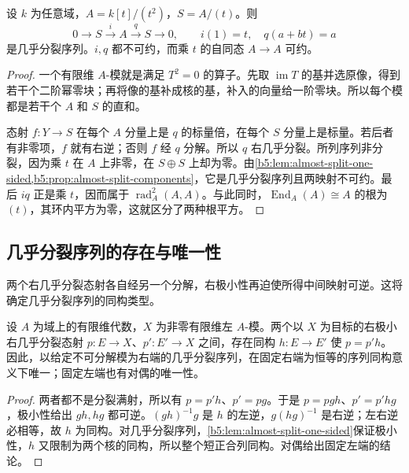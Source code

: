 \begin{example}\label{b5:exm:dual-number-almost-split}
	设 \(k\) 为任意域，\(A=k[t]/(t^2)\)，\(S=A/(t)\)。则
	\[
		0\longrightarrow S\xrightarrow{i}A\xrightarrow{q}S\longrightarrow0,
		\qquad i(1)=t,\quad q(a+bt)=a
	\]
	是几乎分裂序列。\(i,q\) 都不可约，而乘 \(t\) 的自同态 \(A\to A\) 可约。
\end{example}
\begin{proof}
	一个有限维 \(A\)-模就是满足 \(T^2=0\) 的算子。先取 \(\operatorname{im}T\) 的基并选原像，得到若干个二阶幂零块；再将像的基补成核的基，补入的向量给一阶零块。所以每个模都是若干个 \(A\) 和 \(S\) 的直和。

	态射 \(f:Y\to S\) 在每个 \(A\) 分量上是 \(q\) 的标量倍，在每个 \(S\) 分量上是标量。若后者有非零项，\(f\) 就有右逆；否则 \(f\) 经 \(q\) 分解。所以 \(q\) 右几乎分裂。所列序列非分裂，因为乘 \(t\) 在 \(A\) 上非零，在 \(S\oplus S\) 上却为零。由\cref{b5:lem:almost-split-one-sided,b5:prop:almost-split-components}，它是几乎分裂序列且两映射不可约。最后 \(iq\) 正是乘 \(t\)，因而属于 \(\operatorname{rad}_A^2(A,A)\)。与此同时，\(\operatorname{End}_A(A)\cong A\) 的根为 \((t)\)，其环内平方为零，这就区分了两种根平方。
\end{proof}

\subsection{几乎分裂序列的存在与唯一性}
\label{b5:subsec:1005:03}

两个右几乎分裂态射各自经另一个分解，右极小性再迫使所得中间映射可逆。这将确定几乎分裂序列的同构类型。

\begin{proposition}\label{b5:prop:almost-split-uniqueness}
	设 \(A\) 为域上的有限维代数，\(X\) 为非零有限维左 \(A\)-模。两个以 \(X\) 为目标的右极小右几乎分裂态射 \(p:E\to X\)、\(p':E'\to X\) 之间，存在同构 \(h:E\to E'\) 使 \(p=p'h\)。因此，以给定不可分解模为右端的几乎分裂序列，在固定右端为恒等的序列同构意义下唯一；固定左端也有对偶的唯一性。
\end{proposition}
\begin{proof}
	两者都不是分裂满射，所以有 \(p=p'h\)、\(p'=pg\)。于是 \(p=pgh\)、\(p'=p'hg\)，极小性给出 \(gh,hg\) 都可逆。\((gh)^{-1}g\) 是 \(h\) 的左逆，\(g(hg)^{-1}\) 是右逆；左右逆必相等，故 \(h\) 为同构。对几乎分裂序列，\cref{b5:lem:almost-split-one-sided}保证极小性，\(h\) 又限制为两个核的同构，所以整个短正合列同构。对偶给出固定左端的结论。
\end{proof}

